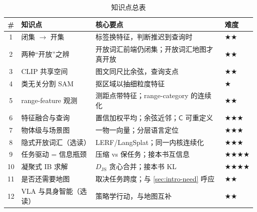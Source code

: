 \begin{table}[H]\centering\small
\caption{知识点总表}
\begin{tabular}{clll}
\toprule
\# & 知识点 & 核心要点 & 难度 \\
\midrule
1 & 闭集 $\to$ 开集 & 标签换特征，判断推迟到查询时 & $\bigstar\bigstar$ \\
2 & 两种“开放”之辨 & 开放词汇前端仍闭集；开放词汇地图才真开放 & $\bigstar\bigstar$ \\
3 & CLIP 共享空间 & 图文同尺比余弦，查询支点 & $\bigstar\bigstar$ \\
4 & 类无关分割 SAM & 抠区域以抽细粒度特征 & $\bigstar$ \\
5 & range-feature 观测 & 测距点带特征；range-category 的连续化 & $\bigstar\bigstar$ \\
6 & 特征融合与查询 & 置信加权平均；余弦近邻；$\mathsf{C}$ 可重定义 & $\bigstar\bigstar\bigstar$ \\
7 & 物体级与场景图 & 一物一向量；分层语言定位 & $\bigstar\bigstar\bigstar$ \\
8 & 隐式开放词汇（选读）& LERF/LangSplat；同一内核连续化 & $\bigstar\bigstar\bigstar$ \\
9 & 任务驱动 = 信息瓶颈 & 压缩 vs 保任务；接本书互信息 & $\bigstar\bigstar\bigstar\bigstar$ \\
10 & 凝聚式 IB 求解 & $D_{\mathrm{JS}}$ 贪心合并；接本书 KL & $\bigstar\bigstar\bigstar\bigstar$ \\
11 & 是否还需要地图 & 取决任务跨度；与 \cref{sec:intro-need} 呼应 & $\bigstar\bigstar$ \\
12 & VLA 与具身智能（选读）& 策略学行动，与地图互补 & $\bigstar\bigstar$ \\
\bottomrule
\end{tabular}
\end{table}

